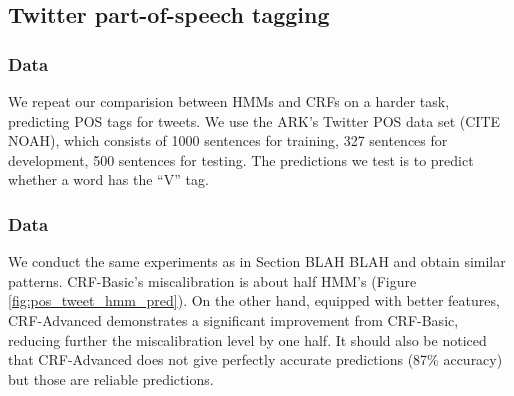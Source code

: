 \subsection{Twitter part-of-speech tagging}
\subsubsection{Data}

We repeat our comparision between HMMs and CRFs on a harder task, predicting POS tags for tweets. We use the ARK's Twitter POS data set (CITE NOAH), which consists of 1000 sentences for training, 327 sentences for development, 500 sentences for testing. The predictions we test is to predict whether a word has the ``V'' tag. 

\subsubsection{Data}

We conduct the same experiments as in Section BLAH BLAH and obtain similar patterns. CRF-Basic's miscalibration is about half HMM's (Figure \ref{fig:pos_tweet_hmm_pred}). On the other hand, equipped with better features, CRF-Advanced demonstrates a significant improvement from CRF-Basic, reducing further the miscalibration level by one half. It should also be noticed that CRF-Advanced does not give perfectly accurate predictions (87\% accuracy) but those are reliable predictions.   

